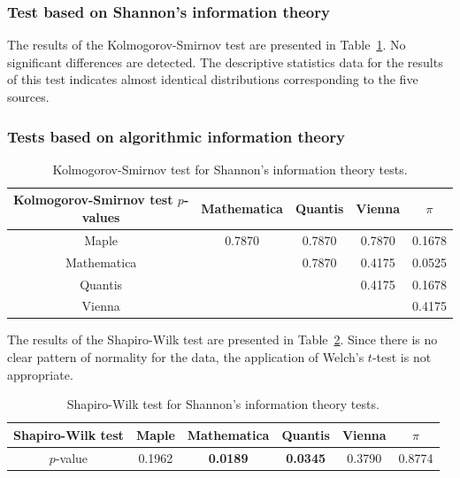 \documentclass[10pt]{article}%
\begin{document}
 \subsubsection{Test based on Shannon's information theory}

 The results of the Kolmogorov-Smirnov test are presented in  Table~\ref{tab:6}.
No significant differences are detected. The descriptive statistics
data for the results of this test  indicates almost identical
distributions corresponding to the five sources.


\subsubsection{Tests based on algorithmic information theory}


\begin{table}
\caption{Kolmogorov-Smirnov test for Shannon's information theory tests.}\label{tab:6}
 \begin{center}
 \begin{tabular}
[c]{ c c c c c }
\hline\hline
Kolmogorov-Smirnov test $p$-values & Mathematica & Quantis & Vienna & $\pi$ \\\hline
Maple & 0.7870 & 0.7870 & 0.7870 & 0.1678\\
Mathematica &  & 0.7870 & 0.4175 & 0.0525\\
Quantis &  &  & 0.4175 & 0.1678\\
Vienna &  &  &  & 0.4175\\\hline\hline
\end{tabular}
\end{center}
\end{table}



The results of the Shapiro-Wilk test are presented in Table~\ref{tab:7}.
Since there is no clear
pattern of normality for the data, the application of Welch's $t$-test is not
appropriate.


\begin{table}
\caption{Shapiro-Wilk test for Shannon's information theory tests.}\label{tab:7}
\begin{center}
\begin{tabular}
[c]{ c c c c c c }\hline\hline
Shapiro-Wilk test & Maple & Mathematica & Quantis  & Vienna  & $\pi$\\\hline
$p$-value & 0.1962 & \bf{0.0189} &
\bf{0.0345} & 0.3790 & 0.8774\\\hline\hline
\end{tabular}
\end{center}
\end{table}
\end{document}

